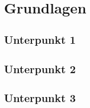 \section{Grundlagen}
\label{sec:grundlagen}

\subsection{Unterpunkt 1}

\subsection{Unterpunkt 2}

\subsection{Unterpunkt 3}

